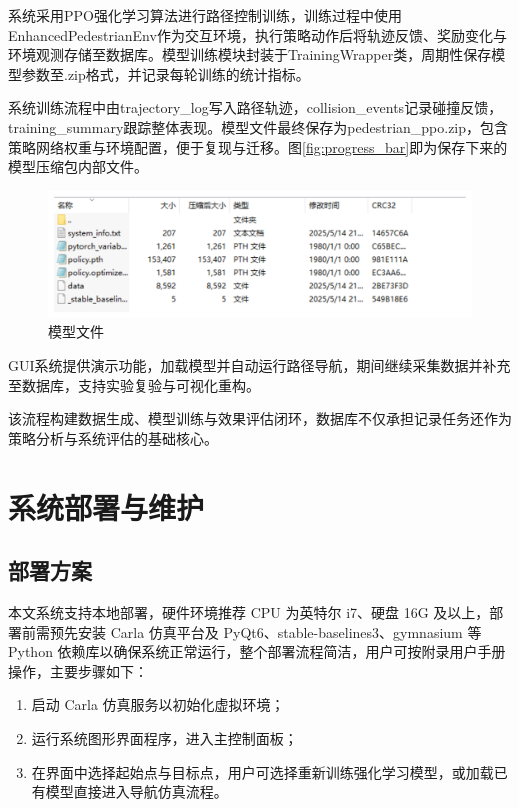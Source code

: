 系统采用PPO强化学习算法进行路径控制训练，训练过程中使用EnhancedPedestrianEnv作为交互环境，执行策略动作后将轨迹反馈、奖励变化与环境观测存储至数据库。模型训练模块封装于TrainingWrapper类，周期性保存模型参数至.zip格式，并记录每轮训练的统计指标。

系统训练流程中由trajectory\_log写入路径轨迹，collision\_events记录碰撞反馈，training\_summary跟踪整体表现。模型文件最终保存为pedestrian\_ppo.zip，包含策略网络权重与环境配置，便于复现与迁移。图\ref{fig:progress_bar}即为保存下来的模型压缩包内部文件。

\begin{figure}[H]
    \centering
    \includegraphics[width=1\textwidth]{images/model.pdf}
    \caption{模型文件}
    \label{fig:model}
\end{figure}

GUI系统提供演示功能，加载模型并自动运行路径导航，期间继续采集数据并补充至数据库，支持实验复验与可视化重构。

该流程构建数据生成、模型训练与效果评估闭环，数据库不仅承担记录任务还作为策略分析与系统评估的基础核心。

\section{系统部署与维护}

\subsection{部署方案}

本文系统支持本地部署，硬件环境推荐 CPU 为英特尔 i7、硬盘 16G 及以上，部署前需预先安装 Carla 仿真平台及 PyQt6、stable-baselines3、gymnasium 等 Python 依赖库以确保系统正常运行，整个部署流程简洁，用户可按附录用户手册操作，主要步骤如下：

\begin{enumerate}
    \item 启动 Carla 仿真服务以初始化虚拟环境；
    \item 运行系统图形界面程序，进入主控制面板；
    \item 在界面中选择起始点与目标点，用户可选择重新训练强化学习模型，或加载已有模型直接进入导航仿真流程。
\end{enumerate}


